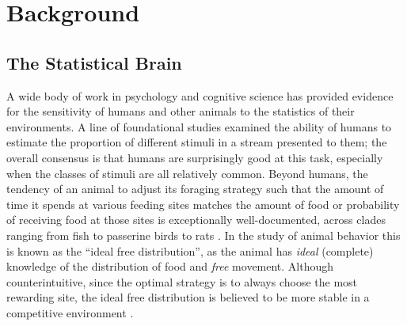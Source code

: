 \documentclass{article}
\theoremstyle{remark}
\newcommand{\1}{\mathbbm{1}}
\begin{document}


\section{Background}
\subsection{The Statistical Brain}
A wide body of work in psychology and cognitive science has provided evidence for the sensitivity of humans and other animals to the statistics of their environments. A line of foundational studies \cite{simpson1961psychophysical, erlick1964absolute, pitz1965response, pitz1966sequential} examined the ability of humans to estimate the proportion of different stimuli in a stream presented to them; the overall consensus is that humans are surprisingly good at this task, especially when the classes of stimuli are all relatively common. 
Beyond humans, the tendency of an animal to adjust its foraging strategy such that the amount of time it spends at various feeding sites matches the amount of food or probability of receiving food at those sites is exceptionally well-documented, across clades ranging from fish to passerine birds to rats \cite{brunswik1939probability, estes1964probability, bitterman1965phyletic}. In the study of animal behavior this is known as the ``ideal free distribution'', as the animal has \emph{ideal} (complete) knowledge of the distribution of food and \emph{free} movement. Although counterintuitive, since the optimal strategy is to always choose the most rewarding site, the ideal free distribution is believed to be more stable in a competitive environment \cite{gallistel1990organization}.
\end{document}
